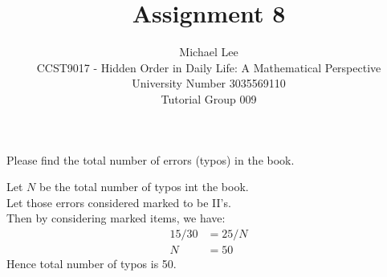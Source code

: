 \documentclass[12pt]{article}
\newenvironment{question}[2][Question]{\begin{trivlist}
    \item[\hskip \labelsep {\bfseries #1}\hskip \labelsep {\bfseries #2.}]}{\end{trivlist}}
\newenvironment{answer}[2][Answer]{\begin{trivlist}
    \item[\hskip \labelsep {\bfseries #1}\hskip \labelsep {\bfseries #2.}]}{\end{trivlist}}
\begin{document}


\title{Assignment 8}%
\author{Michael Lee\\ %
	CCST9017 - Hidden Order in Daily Life: A Mathematical Perspective \\
	University Number 3035569110 \\
	Tutorial Group 009
} %


\maketitle

\begin{question}{Q. 1}
	Please find the total number of errors (typos) in the book.
\end{question}
\begin{answer}{Q. 1}
	\hfill \break
	Let $N$ be the total number of typos int the book. \\
	Let those errors considered marked to be II's. \\
	Then by considering marked items, we have:
	\begin{align}
		15/30 & = 25/N \\
		N     & = 50
	\end{align}
	Hence total number of typos is 50.
\end{answer}
\end{document}
